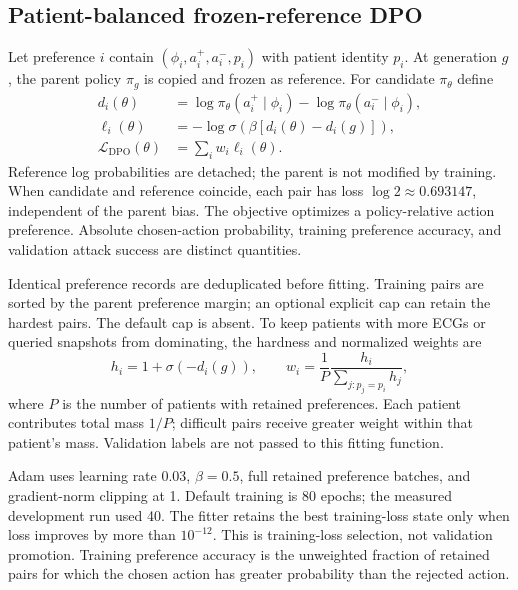 \subsection{Patient-balanced frozen-reference DPO}
Let preference $i$ contain $(\phi_i,a_i^+,a_i^-,p_i)$ with patient identity $p_i$. At generation $g$, the parent policy $\pi_g$ is copied and frozen as reference. For candidate $\pi_\theta$ define
\begin{align}
 d_i(\theta)&=\log\pi_\theta(a_i^+\mid\phi_i)-\log\pi_\theta(a_i^-\mid\phi_i),\\
 \ell_i(\theta)&=-\log\sigma\!\left(\beta[d_i(\theta)-d_i(g)]\right),\\
 \mathcal L_{\mathrm{DPO}}(\theta)&=\sum_i w_i\ell_i(\theta).
\end{align}
Reference log probabilities are detached; the parent is not modified by training. When candidate and reference coincide, each pair has loss $\log2\approx0.693147$, independent of the parent bias. The objective optimizes a policy-relative action preference. Absolute chosen-action probability, training preference accuracy, and validation attack success are distinct quantities.

Identical preference records are deduplicated before fitting. Training pairs are sorted by the parent preference margin; an optional explicit cap can retain the hardest pairs. The default cap is absent. To keep patients with more ECGs or queried snapshots from dominating, the hardness and normalized weights are
\begin{equation}
 h_i=1+\sigma(-d_i(g)),\qquad
 w_i=\frac{1}{P}\frac{h_i}{\sum_{j:p_j=p_i}h_j},
\end{equation}
where $P$ is the number of patients with retained preferences. Each patient contributes total mass $1/P$; difficult pairs receive greater weight within that patient's mass. Validation labels are not passed to this fitting function.

Adam uses learning rate 0.03, $\beta=0.5$, full retained preference batches, and gradient-norm clipping at 1. Default training is 80 epochs; the measured development run used 40. The fitter retains the best training-loss state only when loss improves by more than $10^{-12}$. This is training-loss selection, not validation promotion. Training preference accuracy is the unweighted fraction of retained pairs for which the chosen action has greater probability than the rejected action.

